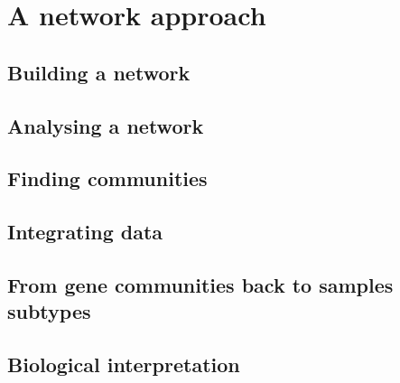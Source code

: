 \section{A network approach}

\subsection{Building a network}

\subsection{Analysing a network}

\subsection{Finding communities}

\subsection{Integrating data}

\subsection{From gene communities back to samples subtypes}

\subsection{Biological interpretation}